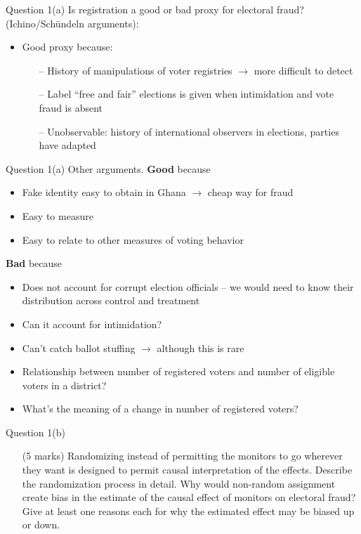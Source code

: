 \documentclass[xcolor=table,dvipsnames]{beamer}
\begin{document}
\begin{frame}{Question 1(a)}
Is registration a good or bad proxy for electoral fraud? (Ichino/Sch\"{u}ndeln arguments): \pause
\begin{itemize}
\item Good proxy because: \pause
\begin{itemize}
\item[--] History of manipulations of voter registries $\rightarrow$ more difficult to detect \pause
\item[--] Label ``free and fair'' elections is given when intimidation and vote fraud is absent \pause
\item[--] Unobservable: history of international observers in elections, parties have adapted
\end{itemize}
\end{itemize}
\end{frame}

\begin{frame}{Question 1(a)}
Other arguments. \textbf{Good} because \pause
\begin{itemize}
\item Fake identity easy to obtain in Ghana $\rightarrow$ cheap way for fraud \pause
\item Easy to measure
\item Easy to relate to other measures of voting behavior
\end{itemize}

\textbf{Bad} because \pause
\begin{itemize}
\item Does not account for corrupt election officials \pause -- we would need to know their distribution across control and treatment \pause
\item Can it account for intimidation? \pause
\item Can't catch ballot stuffing \pause $\rightarrow$ although this is rare \pause
\item Relationship between number of registered voters and number of eligible voters in a district? \pause
\item What's the meaning of a change in number of registered voters?
\end{itemize}
\end{frame}

\begin{frame}{Question 1(b)}

\begin{itemize}
\item[] (5 marks) Randomizing instead of permitting the monitors to go wherever they want is designed to permit causal interpretation of the effects. 
Describe the randomization process in detail.
Why would non-random assignment create bias in the estimate of the causal effect of monitors on electoral fraud?
Give at least one reasons each for why the estimated effect may be biased up or down.\\
\end{itemize}
\end{frame}
\end{document}
